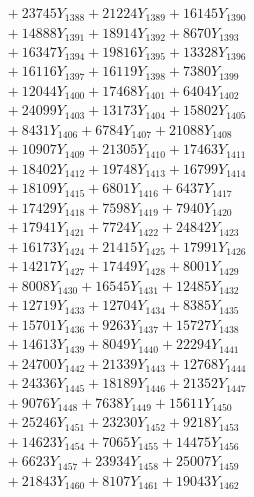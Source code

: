\documentclass[a4paper,10pt]{article}
\begin{document}
{\begin{align}
&\;  + 23745 Y_{1388} + 21224 Y_{1389} + 16145 Y_{1390} \\[0.3ex]
&\;  + 14888 Y_{1391} + 18914 Y_{1392} + 8670 Y_{1393} \\[0.3ex]
&\;  + 16347 Y_{1394} + 19816 Y_{1395} + 13328 Y_{1396} \\[0.3ex]
&\;  + 16116 Y_{1397} + 16119 Y_{1398} + 7380 Y_{1399} \\[0.3ex]
&\;  + 12044 Y_{1400} + 17468 Y_{1401} + 6404 Y_{1402} \\[0.3ex]
&\;  + 24099 Y_{1403} + 13173 Y_{1404} + 15802 Y_{1405} \\[0.3ex]
&\;  + 8431 Y_{1406} + 6784 Y_{1407} + 21088 Y_{1408} \\[0.5ex]\allowbreak
&\;  + 10907 Y_{1409} + 21305 Y_{1410} + 17463 Y_{1411} \\[0.3ex]
&\;  + 18402 Y_{1412} + 19748 Y_{1413} + 16799 Y_{1414} \\[0.3ex]
&\;  + 18109 Y_{1415} + 6801 Y_{1416} + 6437 Y_{1417} \\[0.3ex]
&\;  + 17429 Y_{1418} + 7598 Y_{1419} + 7940 Y_{1420} \\[0.3ex]
&\;  + 17941 Y_{1421} + 7724 Y_{1422} + 24842 Y_{1423} \\[0.3ex]
&\;  + 16173 Y_{1424} + 21415 Y_{1425} + 17991 Y_{1426} \\[0.3ex]
&\;  + 14217 Y_{1427} + 17449 Y_{1428} + 8001 Y_{1429} \\[0.3ex]
&\;  + 8008 Y_{1430} + 16545 Y_{1431} + 12485 Y_{1432} \\[0.3ex]
&\;  + 12719 Y_{1433} + 12704 Y_{1434} + 8385 Y_{1435} \\[0.3ex]
&\;  + 15701 Y_{1436} + 9263 Y_{1437} + 15727 Y_{1438} \\[0.5ex]\allowbreak
&\;  + 14613 Y_{1439} + 8049 Y_{1440} + 22294 Y_{1441} \\[0.3ex]
&\;  + 24700 Y_{1442} + 21339 Y_{1443} + 12768 Y_{1444} \\[0.3ex]
&\;  + 24336 Y_{1445} + 18189 Y_{1446} + 21352 Y_{1447} \\[0.3ex]
&\;  + 9076 Y_{1448} + 7638 Y_{1449} + 15611 Y_{1450} \\[0.3ex]
&\;  + 25246 Y_{1451} + 23230 Y_{1452} + 9218 Y_{1453} \\[0.3ex]
&\;  + 14623 Y_{1454} + 7065 Y_{1455} + 14475 Y_{1456} \\[0.3ex]
&\;  + 6623 Y_{1457} + 23934 Y_{1458} + 25007 Y_{1459} \\[0.3ex]
&\;  + 21843 Y_{1460} + 8107 Y_{1461} + 19043 Y_{1462} \\[0.3ex]

\end{align}}
\end{document}
